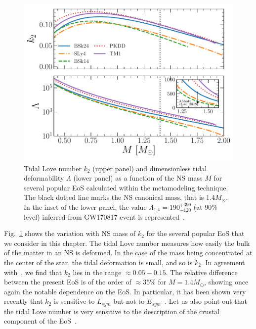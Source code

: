 \begin{figure}[!t]
  \begin{center}
    \includegraphics[width=0.9\linewidth]{figures/tidal_popular.pdf}
  \end{center}
  \caption[Tidal Love number and dimensionless tidal deformability versus 
  neutron star mass for several popular equations of state]{Tidal Love number 
    $k_2$ (upper panel) and 
    dimensionless tidal deformability $\Lambda$ (lower panel) as a function of 
    the NS mass $M$ for several popular EoS calculated within the metamodeling 
  technique. The black dotted line marks the NS canonical mass, that is
$1.4M_\odot$. In the inset of the lower panel, the value 
$\Lambda_{1.4} = 190_{-120}^{+390}$ (at $90\%$ level) inferred from GW170817 
event is represented~\cite{GW1}.}\label{fig:tidal_popular}
\end{figure}

Fig.~\ref{fig:tidal_popular} shows the variation with NS mass of $k_2$ for the 
several popular EoS that we consider in this chapter. The tidal Love number
measures how easily the bulk of the matter in an NS is deformed. In the case
of the mass being concentrated at the center of the star, the tidal deformation 
is small, and so is $k_2$. In agreement with~\cite{Hinderer2010}, we find that 
$k_2$ lies in the range $\approx 0.05-0.15$. The relative difference between
the present EoS is of the order of $\approx 35\%$ for $M=1.4M_\odot$, showing
once again the notable dependence on the EoS. {In particular, it has been
shown very recently that $k_2$ is sensitive to $L_{sym}$ but not to
$E_{sym}$~\cite{Perot2019,Perot2020}.} 
Let us also point out that the tidal Love number is very sensitive to the 
description of the crustal component of the EoS~\cite{Piekarewicz2019}. 

